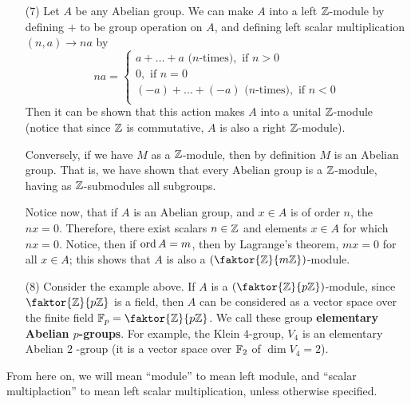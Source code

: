 \begin{example}
\begin{enumerate}
         \item[(7)] Let $A$ be any Abelian group. We can make $A$ into a left
             $\mathbb{Z}$-module by defining $+$ to be group operation on $A$, and
             defining left scalar multiplication $(n,a) \xrightarrow{} na$ by
             \begin{equation*}
                 na=\begin{cases}
                     a+\dots+a \text{ ($n$-times)}, \text{ if } n>0  \\
                     0, \text{ if } n=0 \\
                     (-a)+\dots+(-a) \text{ ($n$-times)}, \text{ if } n<0  \\
                    \end{cases}
             \end{equation*}
             Then it can be shown that this action makes $A$ into a unital
             $\mathbb{Z}$-module (notice that since $\mathbb{Z}$ is commutative, $A$ is also a
             right $\mathbb{Z}$-module).

             Conversely, if we have $M$ as a  $\mathbb{Z}$-module, then by definition
             $M$ is an Abelian group. That is, we have shown that every Abelian
             group is a $\mathbb{Z}$-module, having as  $\mathbb{Z}$-submodules all subgroups.

             Notice now, that if  $A$ is an Abelian group, and  $x \in A$ is of
             order  $n$, the $nx=0$. Therefore, there exist scalars  $n \in \mathbb{Z}$
             and elements  $x \in A$ for which  $nx=0$. Notice, then if
             $\operatorname{ord}{A}=m$, then by Lagrange's theorem, $mx=0$ for all  $x \in A$;
             this shows that  $A$ is also a $(\faktor{\Z}{m\Z})$-module.

         \item[(8)] Consider the example above. If $A$ is a
             $(\faktor{\Z}{p\Z})$-module, since $\faktor{\Z}{p\Z}$ is a field,
             then $A$ can be considered as a vector space over the finite field
              $\F_p=\faktor{\Z}{p\Z}$. We call these group  \textbf{elementary
                  Abelian $p$-groups}. For example, the Klein $4$-group, $V_4$
                  is an elementary Abelian $2$ -group (it is a vector space over
                  $\mathbb{F}_2$ of $\dim{V_4}=2$).
    \end{enumerate}
\end{example}

\begin{remark}
    From here on, we will mean ``module'' to mean left module, and ``scalar
    multiplaction'' to mean left scalar multiplication, unless otherwise specified.
\end{remark}

